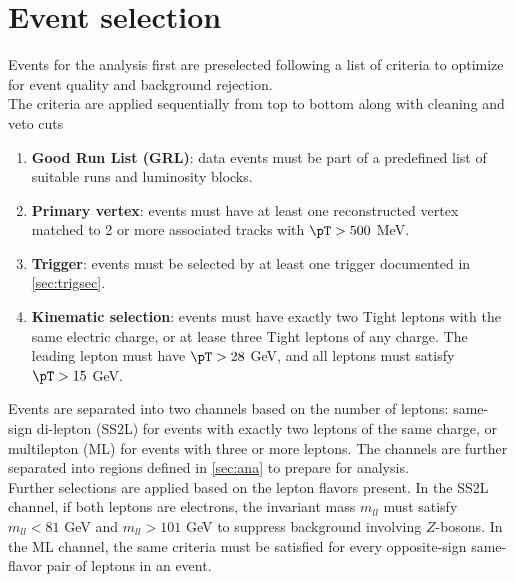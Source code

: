\documentclass[../thesis.tex]{subfiles}
\begin{document}
\vspace{-1\baselineskip}


\section{Event selection}
Events for the analysis first are preselected following a list of criteria to optimize for event quality and background rejection.\\
The criteria are applied sequentially from top to bottom along with cleaning and veto cuts

\begin{enumerate}
\item \textbf{Good Run List (GRL)}: data events must be part of a predefined list of suitable runs and luminosity blocks.
\item \textbf{Primary vertex}: events must have at least one reconstructed vertex matched to 2 or more associated tracks with $\pT>500$ MeV.
\item \textbf{Trigger}: events must be selected by at least one trigger documented in \autoref{sec:trigsec}.
\item \textbf{Kinematic selection}: events must have exactly two Tight leptons with the same electric charge, or at lease three Tight leptons of any charge. The leading lepton must have $\pT>28$ GeV, and all leptons must satisfy $\pT>15$ GeV.
\end{enumerate}
Events are separated into two channels based on the number of leptons: same-sign di-lepton (SS2L) for events with exactly two leptons of the same charge, or multilepton (ML) for events with three or more leptons. The channels are further separated into regions defined in \autoref{sec:ana} to prepare for analysis.\\
Further selections are applied based on the lepton flavors present. In the SS2L channel, if both leptons are electrons, the invariant mass $m_{ll}$ must satisfy $m_{ll}<81$ GeV and $m_{ll}>101$ GeV to suppress background involving $Z$-bosons. In the ML channel, the same criteria must be satisfied for every opposite-sign same-flavor pair of leptons in an event.
\end{document}
